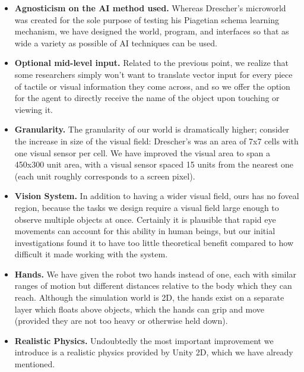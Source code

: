 \begin{itemize}
\item \textbf{Agnosticism on the AI method used.} Whereas Drescher's microworld was created for the sole purpose of testing his Piagetian schema learning mechanism, we have designed the world, program, and interfaces so that as wide a variety as possible of AI techniques can be used. 
\item \textbf{Optional mid-level input.} Related to the previous point, we realize that some researchers simply won't want to translate vector input for every piece of tactile or visual information they come across, and so we offer the option for the agent to directly receive the name of the object upon touching or viewing it. 
\item \textbf{Granularity.} The granularity of our world is dramatically higher; consider the increase in size of the visual field: Drescher's was an area of 7x7 cells with one visual sensor per cell. We have improved the visual area to span a 450x300 unit area, with a visual sensor spaced 15 units from the nearest one (each unit roughly corresponds to a screen pixel).
\item \textbf{Vision System.} In addition to having a wider visual field, ours has no foveal region, because the tasks we design require a visual field large enough to observe multiple objects at once. Certainly it is plausible that rapid eye movements can account for this ability in human beings, but our initial investigations found it to have too little theoretical benefit compared to how difficult it made working with the system.
\item \textbf{Hands.} We have given the robot two hands instead of one, each with similar ranges of motion but different distances relative to the body which they can reach. Although the simulation world is 2D, the hands exist on a separate layer which floats above objects, which the hands can grip and move (provided they are not too heavy or otherwise held down).
\item \textbf{Realistic Physics.} Undoubtedly the most important improvement we introduce is a realistic physics provided by Unity 2D, which we have already mentioned.
\end{itemize}

